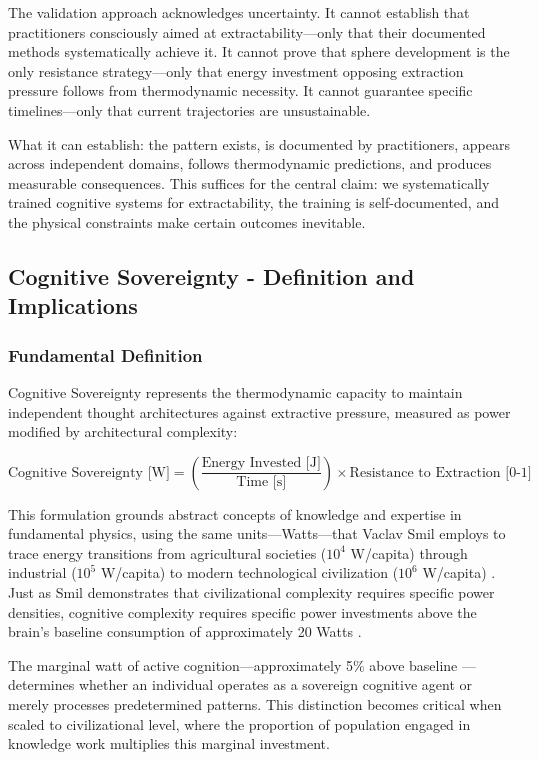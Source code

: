The validation approach acknowledges uncertainty. It cannot establish that practitioners consciously aimed at extractability---only that their documented methods systematically achieve it. It cannot prove that sphere development is the only resistance strategy---only that energy investment opposing extraction pressure follows from thermodynamic necessity. It cannot guarantee specific timelines---only that current trajectories are unsustainable.

What it can establish: the pattern exists, is documented by practitioners, appears across independent domains, follows thermodynamic predictions, and produces measurable consequences. This suffices for the central claim: we systematically trained cognitive systems for extractability, the training is self-documented, and the physical constraints make certain outcomes inevitable.

\subsection{Cognitive Sovereignty - Definition and Implications}

\subsubsection{Fundamental Definition}

Cognitive Sovereignty represents the thermodynamic capacity to maintain independent thought architectures against extractive pressure, measured as power modified by architectural complexity:

\begin{equation}
\text{Cognitive Sovereignty [W]} = \left(\frac{\text{Energy Invested [J]}}{\text{Time [s]}}\right) \times \text{Resistance to Extraction [0-1]}
\end{equation}

This formulation grounds abstract concepts of knowledge and expertise in fundamental physics, using the same units—Watts—that Vaclav Smil employs to trace energy transitions from agricultural societies ($10^4$ W/capita) through industrial ($10^5$ W/capita) to modern technological civilization ($10^6$ W/capita) \citep{smil2017}. Just as Smil demonstrates that civilizational complexity requires specific power densities, cognitive complexity requires specific power investments above the brain's baseline consumption of approximately 20 Watts \citep{raichle2002}.

The marginal watt of active cognition—approximately 5\% above baseline \citep{jamadar2025}—determines whether an individual operates as a sovereign cognitive agent or merely processes predetermined patterns. This distinction becomes critical when scaled to civilizational level, where the proportion of population engaged in knowledge work multiplies this marginal investment.

